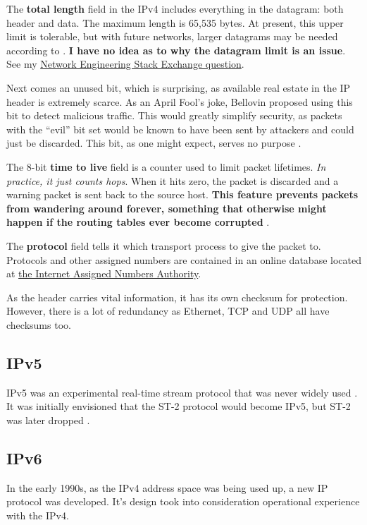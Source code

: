The \textbf{total length} field in the IPv4 includes everything in the datagram: both header and data.
The maximum length is 65,535 bytes. At present, this upper limit is tolerable, but with future networks, larger datagrams may be needed according to \cite{computer-networks-tanenbaum-2012}.
\textbf{I have no idea as to why the datagram limit is an issue}.
See my \href{https://networkengineering.stackexchange.com/questions/54480/why-is-the-ip-datagram-total-length-an-issue}{Network Engineering Stack Exchange question}.

Next comes an unused bit, which is surprising, as available real estate in the IP header is extremely scarce.
As an April Fool's joke, Bellovin proposed using this bit to detect malicious traffic.
This would greatly simplify security, as packets with the ``evil'' bit set would be known to have been sent by attackers and could just be discarded.
This bit, as one might expect, serves no purpose \cite{computer-networks-tanenbaum-2012}.

The 8-bit \textbf{time to live} field is a counter used to limit packet lifetimes.
\textit{In practice, it just counts hops}.
When it hits zero, the packet is discarded and a warning packet is sent back to the source host.
\textbf{This feature prevents packets from wandering around forever, something that otherwise might happen if the routing tables ever become corrupted} \cite{computer-networks-tanenbaum-2012}.

The \textbf{protocol} field tells it which transport process to give the packet to.
Protocols and other assigned numbers are contained in an online database located at \href{https://www.iana.org}{the Internet Assigned Numbers Authority}.

As the header carries vital information, it has its own checksum for protection. However, there is a lot of redundancy as Ethernet, TCP and UDP all have checksums too.

\subsection{IPv5}

IPv5 was an experimental real-time stream protocol that was never widely used \cite{communication-networks-leon-garcia-2000}.
It was initially envisioned that the ST-2 protocol would become IPv5, but ST-2 was later dropped \cite{computer-networking-kurose-2012}.

\subsection{IPv6}
In the early 1990s, as the IPv4 address space was being used up, a new IP protocol was developed.
It's design took into consideration operational experience with the IPv4.

